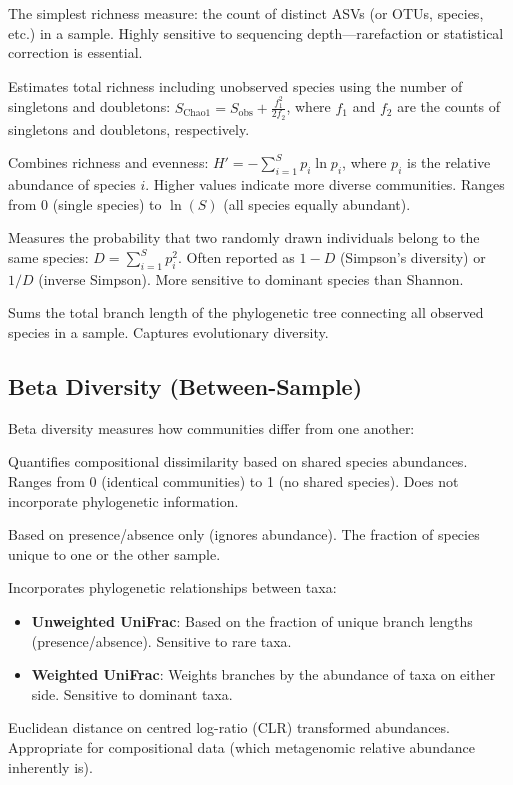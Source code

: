 \begin{description}[style=nextline]
  \item[Observed features] The simplest richness measure: the count of distinct ASVs (or OTUs, species, etc.) in a sample. Highly sensitive to sequencing depth---rarefaction or statistical correction is essential.
  \item[Chao1 estimator] Estimates total richness including unobserved species using the number of singletons and doubletons: $S_{\text{Chao1}} = S_{\text{obs}} + \frac{f_1^2}{2 f_2}$, where $f_1$ and $f_2$ are the counts of singletons and doubletons, respectively.
  \item[Shannon diversity index ($H'$)] Combines richness and evenness: $H' = -\sum_{i=1}^{S} p_i \ln p_i$, where $p_i$ is the relative abundance of species $i$. Higher values indicate more diverse communities. Ranges from 0 (single species) to $\ln(S)$ (all species equally abundant).
  \item[Simpson diversity index ($D$)] Measures the probability that two randomly drawn individuals belong to the same species: $D = \sum_{i=1}^{S} p_i^2$. Often reported as $1-D$ (Simpson's diversity) or $1/D$ (inverse Simpson). More sensitive to dominant species than Shannon.
  \item[Faith's phylogenetic diversity (PD)] Sums the total branch length of the phylogenetic tree connecting all observed species in a sample. Captures evolutionary diversity.
\end{description}

\subsection{Beta Diversity (Between-Sample)}

Beta diversity measures how communities differ from one another:

\begin{description}[style=nextline]
  \item[Bray-Curtis dissimilarity] Quantifies compositional dissimilarity based on shared species abundances. Ranges from 0 (identical communities) to 1 (no shared species). Does not incorporate phylogenetic information.
  \item[Jaccard distance] Based on presence/absence only (ignores abundance). The fraction of species unique to one or the other sample.
  \item[UniFrac] Incorporates phylogenetic relationships between taxa:
    \begin{itemize}[nosep]
      \item \textbf{Unweighted UniFrac}: Based on the fraction of unique branch lengths (presence/absence). Sensitive to rare taxa.
      \item \textbf{Weighted UniFrac}: Weights branches by the abundance of taxa on either side. Sensitive to dominant taxa.
    \end{itemize}
  \item[Aitchison distance] Euclidean distance on centred log-ratio (CLR) transformed abundances. Appropriate for compositional data (which metagenomic relative abundance inherently is).
\end{description}

